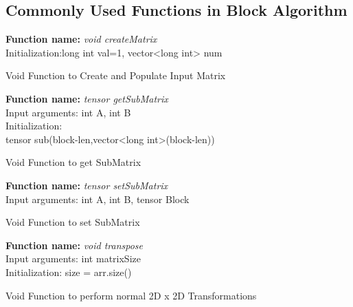 \documentclass[10pt,journal]{article}
\begin{document}
\subsection{Commonly Used Functions in Block Algorithm}
\begin{algorithm}[H]
\SetAlgoLined
\textbf{Function name:} \emph{void createMatrix}\\
Initialization\::long int val=1, vector<long int> num\\

\vspace{10pt} 
\caption{Void Function to Create and Populate Input Matrix}
\end{algorithm}

\begin{algorithm}[H]
\SetAlgoLined
\textbf{Function name:} \emph{tensor getSubMatrix}\\
Input arguments:\: int A, int B\\
Initialization\::\\tensor sub(block-len,vector<long int>(block-len))\\

\vspace{10pt} 
\caption{Void Function to get SubMatrix}
\end{algorithm}

\begin{algorithm}[H]
\SetAlgoLined
\textbf{Function name:} \emph{tensor setSubMatrix}\\
Input arguments:\: int A, int B, tensor Block\\

\vspace{10pt} 
\caption{Void Function to set SubMatrix}
\end{algorithm}

\begin{algorithm}[H]
\SetAlgoLined
\textbf{Function name:} \emph{void transpose}\\
Input arguments:\: int matrixSize\\
Initialization\:: size = arr.size()\\

\vspace{10pt} 
\caption{Void Function to perform normal 2D x 2D Transformations}
\end{algorithm}
\end{document}
